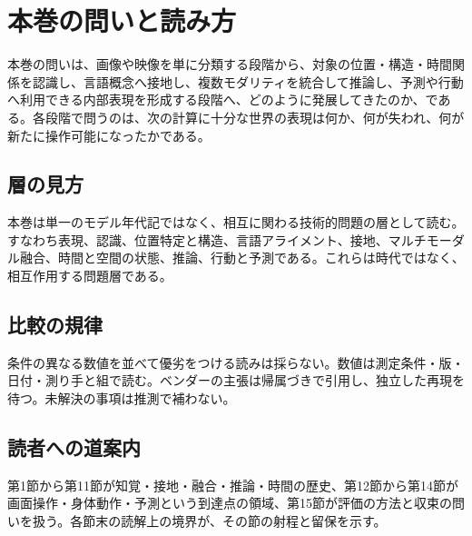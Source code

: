 \documentclass[lualatex,a4paper,10pt]{jlreq}
\begin{document}
\surveycover
\clearpage

\section*{本巻の問いと読み方}
本巻の問いは、画像や映像を単に分類する段階から、対象の位置・構造・時間関係を認識し、言語概念へ接地し、複数モダリティを統合して推論し、予測や行動へ利用できる内部表現を形成する段階へ、どのように発展してきたのか、である。各段階で問うのは、次の計算に十分な世界の表現は何か、何が失われ、何が新たに操作可能になったかである。

\subsection*{層の見方}
本巻は単一のモデル年代記ではなく、相互に関わる技術的問題の層として読む。すなわち表現、認識、位置特定と構造、言語アライメント、接地、マルチモーダル融合、時間と空間の状態、推論、行動と予測である。これらは時代ではなく、相互作用する問題層である。

\subsection*{比較の規律}
条件の異なる数値を並べて優劣をつける読みは採らない。数値は測定条件・版・日付・測り手と組で読む。ベンダーの主張は帰属づきで引用し、独立した再現を待つ。未解決の事項は推測で補わない。

\subsection*{読者への道案内}
第1節から第11節が知覚・接地・融合・推論・時間の歴史、第12節から第14節が画面操作・身体動作・予測という到達点の領域、第15節が評価の方法と収束の問いを扱う。各節末の読解上の境界が、その節の射程と留保を示す。

\tableofcontents
\clearpage

\Needspace{0.20\textheight}
\end{document}
